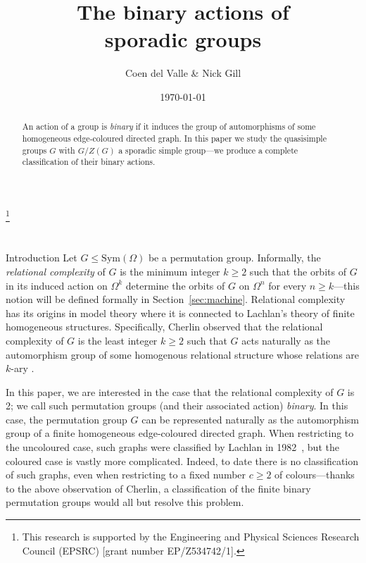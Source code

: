 \documentclass[11pt, a4paper]{amsart}
\makeatletter
\let\oldsection\section
\newcommand\boldsection[1]{\oldsection{\bf #1}}
\newcommand\starsection[1]{\oldsection*{\bf #1}}
\renewcommand\section{\@ifstar\starsection\boldsection}
\makeatother
\begin{document}
\title[Binary sporadic groups]{The binary actions of\\ sporadic groups}
\author{Coen del Valle \& Nick Gill}
\date{\today}
\thanks{This research is supported by the Engineering and Physical Sciences Research Council (EPSRC) [grant number EP/Z534742/1].}
\maketitle
\vspace{-0.5cm}\begin{abstract} An action of a group is \emph{binary} if it induces the group of automorphisms of some homogeneous edge-coloured directed graph. In this paper we study the quasisimple groups $G$ with $G/Z(G)$ a sporadic simple group---we produce a complete classification of their binary actions.\end{abstract}

\section{Introduction}
Let $G\leq\mathrm{Sym}(\Omega)$ be a permutation group. Informally, the \emph{relational complexity} of $G$ is the minimum integer $k\geq 2$ such that the orbits of $G$ in its induced action on $\Omega^k$ determine the orbits of $G$ on $\Omega^n$ for every $n\geq k$---this notion will be defined formally in Section~\ref{sec:machine}. Relational complexity has its origins in model theory where it is connected to Lachlan's theory of finite homogeneous structures. Specifically, Cherlin observed that the relational complexity of $G$ is the least integer $k\geq 2$ such that $G$ acts naturally as the automorphism group of some homogenous relational structure whose relations are $k$-ary \cite{cherlin2000}.

In this paper, we are interested in the case that the relational complexity of $G$ is 2; we call such permutation groups (and their associated action) \emph{binary}. In this case, the permutation group $G$ can be represented naturally as the automorphism group of a finite homogeneous edge-coloured directed graph. When restricting to the uncoloured case, such graphs were classified by Lachlan in 1982~\cite{Lach82}, but the coloured case is vastly more complicated. Indeed, to date there is no classification of such graphs, even when restricting to a fixed number $c\geq 2$ of colours---thanks to the above observation of Cherlin, a classification of the finite binary permutation groups would all but resolve this problem.
\end{document}
